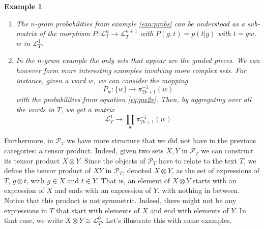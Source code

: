 \documentclass[10pt,a4paper]{elsarticle}
\renewcommand{\L}{\mathcal{L}}
\renewcommand{\P}{\mathcal{P}}
\newtheorem{exa}[theorem]{Example}
\begin{document}
\begin{exa}
	\begin{enumerate}
		\item The $n$-gram probabilities from example \ref{exa:probs} can be understood as  a sub-matrix of the morphism
		$ P\colon\L_{T}^{n}\to\L_{T}^{n+1}$ with $P(g,t)=p(t|g)$ with $t=gw$, $w$ in $\L_{T}^{1}$.
		
		\item In the $n$-gram example the only sets that appear are the graded pieces. We can however form more interesting examples involving more complex sets. For instance, given a word $w$, we can consider the mapping
		\begin{equation}
			P_{w}\colon\{w\}\to\pi^{-1}_{2k+1}(w)
		\end{equation}
		with the probabilities from equation \eqref{eq:pw2v}. Then, by aggregating over all the words in $T$, we get a matrix
		\begin{equation}\label{eq:fibers}
			\L_{T}^{1}\to\prod_{w}\pi^{-1}_{2k+1}(w)
		\end{equation}
	\end{enumerate}
\end{exa}

Furthermore, in $\P_{T}$ we have more structure that we did not have in the previous categories: a tensor product. Indeed, given two sets $X, Y$ in $\P_{T}$ we can construct its tensor product $X \otimes Y$. Since the objects of $\P_{T}$ have to relate to the text $T$, we define the tensor product of $X Y$ in $\P_{T}$, denoted $X \otimes Y$, as the set of expressions of $T$, $g\otimes t$, with $g \in X $ and $t \in Y$. That is, an element of $X \otimes Y$ starts with an expression of $X$ and ends with an expression of $Y$, with nothing in between. Notice that this product is not symmetric. Indeed, there might not be any expressions in $T$ that start with elements of $X$ and end with elements of $Y$. In that case, we write $X\otimes Y \cong \L_{T}^{0}$. Let's illustrate this with some examples.
\end{document}

